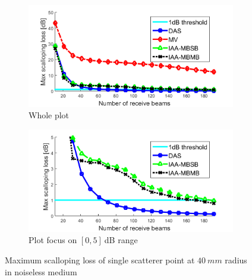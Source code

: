 \begin{figure}[ht]
    \centering
    \begin{subfigure}[t]{\linewidth}
        \includegraphics[width=\linewidth]{./images/results/1/loss_vs_beams.png}
        \caption{Whole plot}
    \end{subfigure}
    \quad
    \begin{subfigure}[t]{\linewidth}
        \includegraphics[width=\linewidth]{./images/results/1/loss_vs_beams_zoom.png}
        \caption{Plot focus on $[0, 5]~$dB range}
    \end{subfigure}
	\caption{Maximum scalloping loss of single scatterer point at $40~mm$ radius in noiseless medium}
	\label{fig:loss_vs_beams}
\end{figure}

